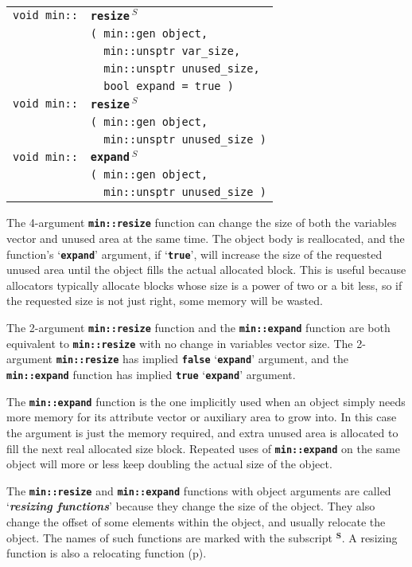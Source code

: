\documentclass[12pt]{article}
\makeatletter
\newcommand{\TT}[1]{{\tt \bfseries #1}}
\newcommand{\skey}[2]{{\bf \em #1#2}\index{#1}}
\newcommand{\ttindex}[1]{\index{#1@{\tt #1}}}
\newcommand{\subsmkey}[2]{$\mathbf{^{#1}}$\index{#1@$^{#1}$!#2}}
\newcommand{\pagref}[1]{p\pageref{#1}}
\newcommand{\EOL}{\penalty \exhyphenpenalty}
\newenvironment{indpar}[1][0.3in]%
	{\begin{list}{}%
		     {\setlength{\itemsep}{0in}%
		      \setlength{\topsep}{0in}%
		      \setlength{\parsep}{1ex}%
		      \setlength{\labelwidth}{#1}%
		      \setlength{\leftmargin}{#1}%
		      \addtolength{\leftmargin}{\labelsep}}%
	 \item}%
	{\end{list}}
\newcommand{\LABEL}[1]{\label{#1}}
\newlength{\ARGBREAKLENGTH}
\newcommand{\ARGBREAK}[1][\ARGBREAKLENGTH]{\\&\hspace*{#1}}
\newcommand{\MINKEY}[1]%
	   {\TT{#1}\ttindex{min::#1}\ttindex{#1}}
\newcommand{\RESIZE}{$\,^S$}
\makeatother
\begin{document}
\begin{indpar}\begin{tabular}{r@{}l}
\verb|void min::| & \MINKEY{resize\RESIZE}\ARGBREAK
    \verb|( min::gen object,|\ARGBREAK
    \verb|  min::unsptr var_size,|\ARGBREAK
    \verb|  min::unsptr unused_size,|\ARGBREAK
    \verb|  bool expand = true )|
\LABEL{MIN::RESIZE} \\
\verb|void min::| & \MINKEY{resize\RESIZE}\ARGBREAK
    \verb|( min::gen object,|\ARGBREAK
    \verb|  min::unsptr unused_size )|
\LABEL{MIN::RESIZE_UNUSED} \\
\verb|void min::| & \MINKEY{expand\RESIZE}\ARGBREAK
    \verb|( min::gen object,|\ARGBREAK
    \verb|  min::unsptr unused_size )|
\LABEL{MIN::EXPAND} \\
\end{tabular}\end{indpar}

The 4-argument \TT{min::resize} function can change
the size of both the variables vector and unused area at the same
time.  The object body is reallocated, and the function's
`\TT{expand}' argument, if `\TT{true}', will increase
the size of the requested unused area until the object fills
the actual allocated block.  This is useful because allocators
typically allocate blocks whose size is a power of two or
a bit less, so if the requested size is not just right, some
memory will be wasted.

The 2-argument \TT{min::resize} function and the \TT{min::\EOL expand}
function are both equivalent to \TT{min::\EOL resize} with no change
in variables vector size.  The 2-argument \TT{min::\EOL resize}
has implied \TT{false} `\TT{expand}' argument, and the
\TT{min::\EOL expand} function has implied \TT{true} `\TT{expand}'
argument.

The \TT{min::expand} function is the one implicitly used when an object simply
needs more memory for its attribute vector or auxiliary area to grow into.
In this case the argument is just the memory required, and extra unused
area is allocated to fill the next real allocated size block.  Repeated
uses of \TT{min::expand} on the same object will more or less keep
doubling the actual size of the object.

The \TT{min::resize} and \TT{min::expand} functions with object arguments
are called `\skey{resizing function}s'\label{RESIZING-FUNCTIONS}
because they change the size of the object.  They also change
the offset of some elements within the object, and usually
relocate the object.
The names of such functions are marked with the subscript
\subsmkey{S}{of function}.  A resizing function is also
a relocating function (\pagref{RELOCATING-FUNCTIONS}).
\end{document}
